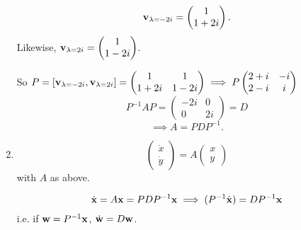 \documentclass[10pt, a4paper]{article}
\begin{document}
\begin{problem}
\begin{solution}
\begin{enumerate}[label = (\alph*)]
            \[
            \mathbf{v}_{\lambda = -2i} = \begin{pmatrix}
                1 \\ 1 + 2i
            \end{pmatrix}.
            \]
            Likewise,
            $\mathbf{v}_{\lambda = 2i} = \begin{pmatrix}
                1 \\ 1 - 2i
            \end{pmatrix}$.
    
            So $P = [\mathbf{v}_{\lambda = -2i}, \mathbf{v}_{\lambda = 2i}] = \begin{pmatrix}
                1 & 1 \\ 1 + 2i & 1 - 2i
            \end{pmatrix} \implies P\begin{pmatrix}
                2 + i & -i \\
                2 - i & i
            \end{pmatrix}$
            \[
            P ^ {-1}AP = \begin{pmatrix}
                -2i & 0 \\
                0 & 2i
            \end{pmatrix} = D
            \]
            \[
            \implies A = PDP ^ {-1}.
            \]

            \item
            \[
            \begin{pmatrix}
                \dot{x} \\ \dot{y}
            \end{pmatrix} = A\begin{pmatrix}
                x \\ y
            \end{pmatrix}
            \]
            with $A$ as above.

            \[
            \dot{\mathbf{x}} = A\mathbf{x} = PDP ^ {-1}\mathbf{x} \implies (P ^ {-1}\dot{\mathbf{x}}) = DP ^ {-1}\mathbf{x}
            \]
            i.e.
            if $\mathbf{w} = P ^ {-1}\mathbf{x}$,
            $\dot{\mathbf{w}} = D\mathbf{w}$.


\end{enumerate}
\end{solution}
\end{problem}
\end{document}
